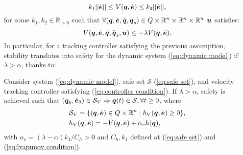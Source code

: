 \begin{equation} \label{eq:lyapunov condition}
    k_1 || \dot{\boldsymbol{e}}|| \leq V({\boldsymbol{q}}, \dot{\boldsymbol{e}}) \leq k_2 || \dot{\boldsymbol{e}}||,
\end{equation}
for some $k_1,k_2\in \mathbb{R}_{>0}$ such that $\forall({\boldsymbol{q}},\dot{\boldsymbol{e}},\dot{{\boldsymbol{q}}},\ddot{{\boldsymbol{q}}}_s)\in Q \times \mathbb{R}^n \times \mathbb{R}^n \times \mathbb{R}^n$ $\boldsymbol{u}$ satisfies:
\begin{equation} \label{eq:controller condition}
    \dot{V}({\boldsymbol{q}},\dot{\boldsymbol{e}},\dot{{\boldsymbol{q}}},\ddot{{\boldsymbol{q}}}_s,\boldsymbol{u}) \leq -\lambda V({\boldsymbol{q}},\dot{\boldsymbol{e}}).
\end{equation}
In particular, for a tracking controller satisfying the previous assumption, stability translates into safety for the dynamic system (\ref{eq:dynamic model}) if $\lambda > \alpha$, thanks to:
\begin{theorem}\label{th:alpha limit}
    Consider system (\ref{eq:dynamic model}), safe set $\mathcal{S}$ (\ref{eq:safe set}), and velocity tracking controller satisfying (\ref{eq:controller condition}). If $\lambda > \alpha$, safety is achieved such that $({\boldsymbol{q}}_0,\dot{\boldsymbol{e}}_0)\in \mathcal{S}_V \Rightarrow {\boldsymbol{q}}(t) \in \mathcal{S}, \forall t\geq 0$, where
    \begin{align}
        &\mathcal{S}_V = \{ ({\boldsymbol{q}},\dot{\boldsymbol{e}})\in Q \times \mathbb{R}^n: h_V({\boldsymbol{q}},\dot{\boldsymbol{e}})\geq 0 \},\\
        &h_V({\boldsymbol{q}},\dot{\boldsymbol{e}}) = -V({\boldsymbol{q}},\dot{\boldsymbol{e}})+ \alpha_e h({\boldsymbol{q}}), \label{eq:h_V}
    \end{align}
    with $\alpha_e = (\lambda - \alpha)k_1/C_h > 0$ and $C_h,k_1$ defined at (\ref{eq:safe set}) and (\ref{eq:lyapunov condition}).
\end{theorem}
